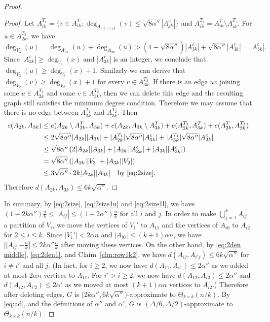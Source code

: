 \documentclass[reqno]{amsart}
\theoremstyle{plain}
\def\a{\alpha}
\begin{document}
\begin{proof}
\begin{proof}
Let $A_{ik}^{T_1}=\{v\in A_{ik}^T: \deg_{A_{(5-i)k}}(v)\le \sqrt{8\alpha''}|A_{jk}^c|\}$ and $A_{ik}^{T_2}=A_{ik}^T\setminus A_{ik}^{T_1}$. For $u\in A_{2k}^{T_2}$, we have
\[
\deg_{V_3} (u) = \deg_{A^c_{3k}}(u) + \deg_{A_{3k}}(u) > ( 1 -\sqrt{8\alpha''} ) |A_{3k}^c| +\sqrt{8\alpha''}|A_{3k}^c| = |A_{3k}^c|.
\]
Since $|A_{3k}^c| \ge \deg_{V_3} (x)$ and $|A_{3k}^c|$ is an integer, we conclude that $\deg_{V_3} (u)\ge  \deg_{V_3} (x) + 1$. Similarly we can derive that $\deg_{V_2} (v)\ge  \deg_{V_2} (x) + 1$ for every $v\in A_{3k}^{T_2}$.
If there is an edge $uv$ joining some $u\in A_{2k}^{T_2}$ and some $v\in A_{3k}^{T_2}$, then we can delete this edge and the resulting graph still satisfies the minimum degree condition. Therefore we may assume that there is no edge between $A_{2k}^{T_2}$ and $A_{3k}^{T_2}$. Then
\begin{align*}
e(A_{2k},A_{3k})& \le e(A_{2k}\setminus A_{2k}^T,A_{3k}) + e(A_{2k},A_{3k}\setminus A_{3k}^T) + e(A_{2k}^{T_1}, A_{3k}^T) + e(A_{2k}^{T}, A_{3k}^{T_1}) \\
                            &\le 2\sqrt{ 8\alpha''}|A_{2k}||A_{3k}|+|A_{2k}^{T_1}|\sqrt{8\alpha''}|A_{3k}^c|+|A_{3k}^{T_1}|\sqrt{8\alpha''}|A_{2k}^c|\\
                            &\le \sqrt{8\alpha''} \left( 2|A_{2k}||A_{3k}| + |A_{2k}| |A_{3k}^c| + |A_{3k}| |A_{2k}^c| \right) \\
                            &= \sqrt{8\alpha''} \left(|A_{2k}| |V_3|+ |A_{3k}| |V_2| \right)\\
                            &\le 3\sqrt{\alpha''} \cdot 2k |A_{2k}||A_{3k}| \quad \text{by } \eqref{eq:2size}.
\end{align*}
Therefore $d(A_{2k},A_{3k})\le 6k \sqrt{\alpha''}$.
\end{proof}


In summary, by \eqref{eq:2size}, \eqref{eq:2size1u} and \eqref{eq:2size1l}, we have $(1-  2k\alpha'') \frac{n}{k} \le |A_{ij}| \le (1 + 2\alpha'' )\frac{n}{k} $ for all $i$ and $j$. In order to make $\bigcup_{j=1}^{k} A_{ij}$ a partition of $V_i$, we move the vertices of $V_1'$ to $A_{11}$ and the vertices of $A_{i0}$ to $A_{i2}$ for $2\le i\le k$. Since $|V_1'| < 2\a n$ and $|A_{i0}| \le (k+1)\a n$, we have $| |A_{ij}| - \tfrac nk | \le 2k \alpha'' \frac{n}{k}$ after moving these vertices. On the other hand, by \eqref{eq:2den middle}, \eqref{eq:2den1}, and Claim~\ref{clm:row1k2}, we have $d(A_{ij}, A_{i'j}) \le 6k \sqrt{\alpha''}$ for $i\ne i'$ and all $j$. (In fact, for $i\ge 2$, we now have $d(A_{11}, A_{i1}) \le 2\alpha''$ as we added at most $2\a n$ vertices to $A_{11}$. For $i'> i\ge 2$, we now have $d(A_{12}, A_{i2}) \le 2\alpha''$ and $d(A_{i2}, A_{i'2}) \le 2\alpha'$ as we moved at most $(k+1)\alpha n$ vertices to $A_{i2}$.) Therefore after deleting edges, $G$ is ($ 2k \alpha'', 6k \sqrt{\alpha''}$)-approximate to $\Theta_{k\times k} (n/k)$. By \eqref{eq:ad}, and the definitions of $\alpha''$ and $\alpha'$,  $G$ is $(\Delta/6, \Delta/2)$-approximate to $\Theta_{k\times k} (n/k)$.
\end{proof}
\end{document}
